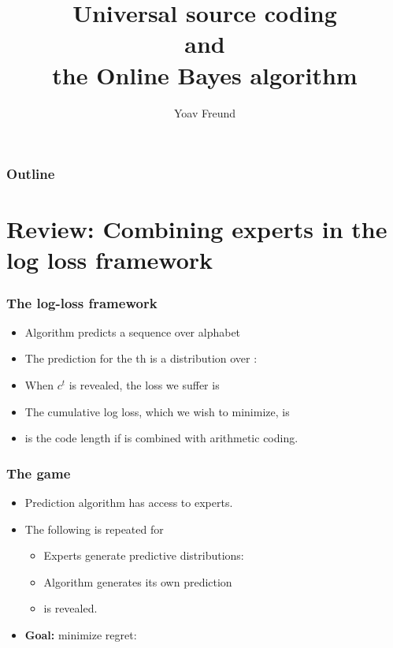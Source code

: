 \documentclass{beamer}
\title[Online Bayes Alg.]%
{Universal source coding \\ and \\ the Online Bayes algorithm}
\author[Freund] %
{Yoav Freund}
\institute[Universities of Somewhere and Elsewhere] %
\begin{document}

\begin{frame}
  \titlepage
\end{frame}

\begin{frame}
  \frametitle{Outline}
  \tableofcontents[pausesections]
\end{frame}

\section{Review: Combining experts in the log loss framework}

\begin{frame}
\frametitle{The log-loss framework}
\begin{itemize}
\item Algorithm  predicts a sequence 
over alphabet 
\item The prediction for the th is a distribution over \R{$\Sigma$}:\\
\item When $c^t$ is revealed, the loss we suffer is 
\item The {\color{blue}cumulative log loss}, which we wish to minimize, 
is 
\item {} is the code length if  is combined with arithmetic coding.
\end{itemize}
\end{frame}

\begin{frame}
\frametitle{The game}
\begin{itemize}
\item Prediction algorithm  has access to  experts.
\item The following is repeated for 
\begin{itemize}
\item Experts generate predictive distributions: 
\item Algorithm generates its own prediction 
\item {} is revealed.
\end{itemize}
\item {\bf Goal:} minimize regret:
\R{\[
-\sum_{t=1}^T \log p_A^t(c^t) + \min_{i=1,\dots,N} \paren{-\sum_{t=1}^T \log p_i^t(c^t)} 
\]}
\end{itemize}
\end{frame}
\end{document}
